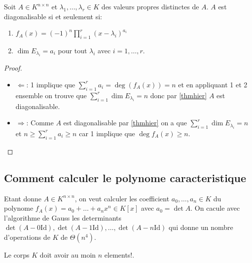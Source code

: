 \begin{theorem}
Soit $A\in K^{n\times n}$ et $\lambda_{1},\dots,\lambda _{r}\in K$ des valeurs propres distinctes de $A$. $A$ est diagonalisable si et seulement si:
\begin{enumerate}
\item $f_{A}(x)=(-1)^{n}\prod_{i=1}^{r}(x-\lambda _{i})^{a_{i}}$
\item $\dim E_{\lambda _{i}}=a_{i}$ pour tout $\lambda _{i}$ avec $i=1,\dots,r$.
\end{enumerate}
\end{theorem}
\begin{proof}
\begin{itemize}
\item $\Leftarrow$: 1 implique que $\sum_{i=1}^{r}a_{i}=\deg(f_{A}(x))=n$ et en appliquant 1 et 2 ensemble on trouve que $\sum_{i=1}^{r}\dim E_{\lambda _{i}}=n$ donc par \ref{thmhier} $A$ est diagonalisable.

\item $\Rightarrow$: Comme $A$ est diagonalisable par \ref{thmhier} on a que $\sum_{i=1}^{r}\dim E_{\lambda _{i}}=n$ et $n \ge  \sum_{i=1}^{r}a_{i}\ge n$ car 1 implique que $\deg f_{A}(x)\geq n$. 
\end{itemize}
\end{proof}

\subsection*{Comment calculer le polynome caracteristique}

Etant donne $A\in K^{n\times n}$, on veut calculer les coefficient $a_{0},\dots,a_{n}\in K$ du polynome $f_{A}(x)=a_{0}+\dots +a_{n}x^{n}\in K[x]$ avec $a_{0}=\det A$. On cacule avec l'algorithme de Gauss les determinants $\det (A-0\mathrm{Id}),\det(A-1\mathrm{Id}),\dots,\det(A-n\mathrm{Id})$ qui donne un nombre d'operations de $K$ de $\Theta(n^{4})$. 
\begin{remark}
Le corps $K$ doit avoir au moin $n$ elements!.
\end{remark}